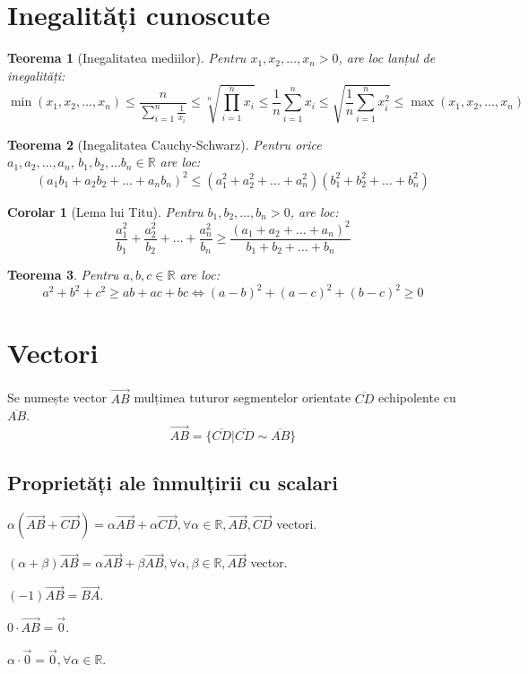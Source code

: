 \documentclass[11pt,a4paper]{article}
\newtheorem{theorem}{Teorema}
\newtheorem{corollary}{Corolar}[subsection]
\begin{document}
  \section{Inegalități cunoscute}

\begin{theorem}[Inegalitatea mediilor]
Pentru $x_1, x_2, \dots, x_n > 0$, are loc lanțul de inegalități:
$$ \min(x_1, x_2, \dots, x_n) \leq \frac{n}{\sum_{i=1}^n \frac{1}{x_i}} \leq \sqrt[n]{\prod_{i=1}^n x_i} \leq \frac{1}{n} \sum_{i=1}^n x_i \leq \sqrt{\frac{1}{n} \sum_{i=1}^n x_i^2} \leq \max(x_1, x_2, \dots, x_n) $$
\end{theorem}
\begin{theorem}[Inegalitatea Cauchy-Schwarz]
Pentru orice $a_1, a_2, \dots, a_n, \, b_1, b_2,\dots b_n \in \mathbb{R}$ are loc:
$$ (a_1b_1 + a_2b_2 + ... + a_nb_n)^2 \leq (a_1^2 + a_2^2 + ... + a_n^2)(b_1^2 + b_2^2 + ... + b_n^2) $$
\end{theorem}
\begin{corollary}[Lema lui Titu] Pentru $b_1, b_2, \dots, b_n > 0$, are loc:\[\frac{a_1^2}{b_1} + \frac{a_2^2}{b_2} + \ldots + \frac{a_n^2}{b_n} \geq \frac{(a_1 + a_2 + \ldots + a_n)^2}{b_1 + b_2 + \ldots + b_n}\]
\end{corollary}
\begin{theorem}
Pentru $a,b,c \in \mathbb{R}$ are loc:
$$a^2+b^2+c^2 \ge ab+ac+bc \Leftrightarrow (a-b)^2+(a-c)^2+(b-c)^2 \ge 0$$
\end{theorem}
\section{Vectori}
Se numește vector $\overrightarrow{AB}$ mulțimea tuturor segmentelor orientate $\overline{CD}$ echipolente cu $\overline{AB}$. \[\overrightarrow{AB}=\{\overline{CD} \vert \overline{CD} \sim \overline{AB}\}\]
\subsection{Proprietăți ale înmulțirii cu scalari}
\begin{Properties}
\item $\alpha(\overrightarrow{AB}+\overrightarrow{CD})= \alpha\overrightarrow{AB}+\alpha\overrightarrow{CD}, \forall \alpha \in \mathbb{R}, \overrightarrow{AB}, \overrightarrow{CD}$ vectori.
\item $(\alpha + \beta)\overrightarrow{AB} = \alpha \overrightarrow{AB}+\beta \overrightarrow{AB}, \forall \alpha, \beta \in \mathbb{R}, \overrightarrow{AB}$ vector.
\item $(-1)\overrightarrow{AB}=\overrightarrow{BA}$.
\item $0 \cdot \overrightarrow{AB}=\overrightarrow{0}$.
\item $\alpha \cdot \overrightarrow{0} = \overrightarrow{0}, \forall \alpha \in \mathbb{R}$.
\end{Properties}
\end{document}
